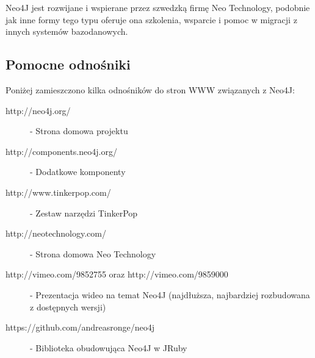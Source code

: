 Neo4J jest rozwijane i wspierane przez szwedzką firmę Neo Technology, podobnie jak inne formy tego typu oferuje ona szkolenia, wsparcie i pomoc w migracji z innych systemów bazodanowych.

\subsection*{Pomocne odnośniki}

Poniżej zamieszczono kilka odnośników do stron WWW związanych z Neo4J:

\begin{description}
 \item [http://neo4j.org/] - Strona domowa projektu
 \item [http://components.neo4j.org/] - Dodatkowe komponenty
 \item [http://www.tinkerpop.com/] - Zestaw narzędzi TinkerPop
 \item [http://neotechnology.com/] - Strona domowa Neo Technology 
 \item [http://vimeo.com/9852755 oraz http://vimeo.com/9859000] - Prezentacja wideo na temat Neo4J (najdłuższa, najbardziej rozbudowana z dostępnych wersji)
 \item [https://github.com/andreasronge/neo4j] - Biblioteka obudowująca Neo4J w JRuby
\end{description}
